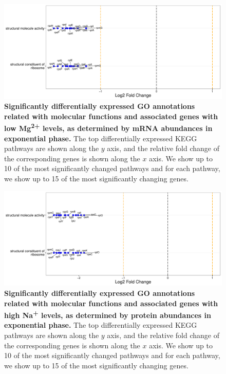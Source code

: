 \documentclass[a4paper]{article}
\begin{document}
\clearpage
\begin{figure}
	\includegraphics[width=1.0\textwidth]{../../d_figures/mf_n_03.pdf}
	\caption[Significantly differentially expressed GO annotations associated with molecular functions for mRNA samples in exponential phase tested for low Mg\textsuperscript{2+} against base Mg\textsuperscript{2+}]
	{\textbf{Significantly differentially expressed GO annotations related with molecular functions and associated genes with low Mg\textsuperscript{2+} levels, as determined by mRNA abundances in exponential phase.} The top differentially expressed KEGG pathways are shown along the $y$ axis, and the relative fold change of the corresponding genes is shown along the $x$ axis. We show up to 10 of the most significantly changed pathways and for each pathway, we show up to 15 of the most significantly changing genes.}
\end{figure}

\clearpage
\begin{figure}
	\includegraphics[width=1.0\textwidth]{../../d_figures/mf_n_04.pdf}
	\caption[Significantly differentially expressed GO annotations associated with molecular functions for protein samples in exponential phase tested for high Na\textsuperscript{+} against base Na\textsuperscript{+}]
	{\textbf{Significantly differentially expressed GO annotations related with molecular functions and associated genes with high Na\textsuperscript{+} levels, as determined by protein abundances in exponential phase.} The top differentially expressed KEGG pathways are shown along the $y$ axis, and the relative fold change of the corresponding genes is shown along the $x$ axis. We show up to 10 of the most significantly changed pathways and for each pathway, we show up to 15 of the most significantly changing genes.}
\end{figure}
\end{document}
